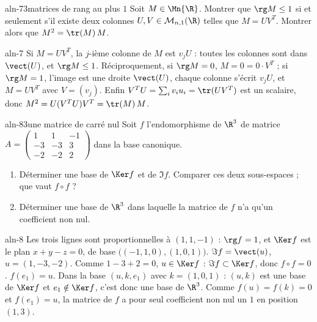 \begin{exo}{aln-7}{3}{matrices de rang au plus $1$}
Soit $M\in\Mn{\R}$. Montrer que $\rg M\leq1$ si et seulement s'il existe deux colonnes $U,V\in\mathcal M_{n,1}(\R)$ telles que
$M=UV^T$. Montrer alors que $M^2=\tr(M)\,M$.
\end{exo}
\begin{corrige}{aln-7}
Si $M=UV^T$, la $j$-ième colonne de $M$ est $v_jU$ : toutes les colonnes sont dans $\vect(U)$, et $\rg M\leq1$. Réciproquement, si
$\rg M=0$, $M=0=0\cdot V^T$ ; si $\rg M=1$, l'image est une droite $\vect(U)$, chaque colonne s'écrit $v_jU$, et $M=UV^T$ avec
$V=(v_j)$. Enfin $V^TU=\sum_iv_iu_i=\tr(UV^T)$ est un scalaire, donc $M^2=U(V^TU)V^T=\tr(M)\,M$.
\end{corrige}

\begin{exo}{aln-8}{3}{une matrice de carré nul}
Soit $f$ l'endomorphisme de $\R^3$ de matrice $A=\begin{pmatrix}1&1&-1\\-3&-3&3\\-2&-2&2\end{pmatrix}$ dans la base canonique.
\begin{enumerate}
\item Déterminer une base de $\Ker f$ et de $\Im f$. Comparer ces deux sous-espaces ; que vaut $f\circ f$ ?
\item Déterminer une base de $\R^3$ dans laquelle la matrice de $f$ n'a qu'un coefficient non nul.
\end{enumerate}
\end{exo}
\begin{corrige}{aln-8}
 Les trois lignes sont proportionnelles à $(1,1,-1)$ : $\rg f=1$, et $\Ker f$ est le plan $x+y-z=0$, de base
$\big((-1,1,0),(1,0,1)\big)$. $\Im f=\vect(u)$, $u=(1,-3,-2)$. Comme $1-3+2=0$, $u\in\Ker f$ : $\Im f\subset\Ker f$, donc $f\circ f=0$.
 $f(e_1)=u$. Dans la base $(u,k,e_1)$ avec $k=(1,0,1)$ : $(u,k)$ est une base de $\Ker f$ et $e_1\notin\Ker f$, c'est donc une
base de $\R^3$. Comme $f(u)=f(k)=0$ et $f(e_1)=u$, la matrice de $f$ a pour seul coefficient non nul un $1$ en position $(1,3)$.
\end{corrige}

